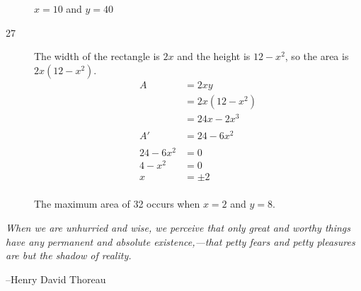\documentclass[fleqn]{exam}
\begin{document}
\begin{description}
$x = 10$ and $y = 40$

\item[27]
The width of the rectangle is $2x$ and the height is $12 - x^2$, so the area is $2x(12 - x^2)$.
\begin{align*}
  A &= 2xy \\
    &= 2x(12-x^2) \\
    &= 24x - 2x^3 \\
\\
  A' &= 24 - 6x^2 \\
\\
  24 - 6x^2 &= 0 \\
  4 - x^2 &= 0 \\
  x &= \pm 2 \\
\end{align*}

The maximum area of 32 occurs when $x = 2$ and $y = 8$.

\end{description}

\else

\vspace{10 cm}

{\em When we are unhurried and wise, we perceive that only great and worthy things have any permanent and absolute
existence,---that petty fears and petty pleasures are but the shadow of reality.}

\vspace{.2 cm}

\hspace{1 cm} --Henry David Thoreau

\fi
\end{document}
